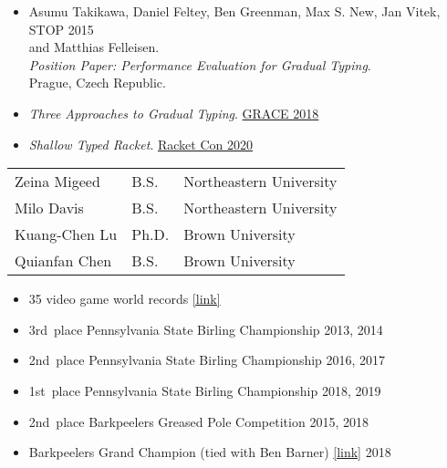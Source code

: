 \documentclass{article}
\begin{document}
\begin{itemize}
\item
  Asumu Takikawa, Daniel Feltey, Ben Greenman, Max S. New, Jan Vitek, \hfill STOP 2015 \\
   and Matthias Felleisen. \\
   \emph{Position Paper: Performance Evaluation for Gradual Typing}. \\
  Prague, Czech Republic.
\end{itemize}

\newpage
{}
\begin{itemize}
  \item \emph{Three Approaches to Gradual Typing}. \hfill \href{https://2018.splashcon.org/track/grace-2018-papers}{GRACE 2018}
  \item \emph{Shallow Typed Racket}. \hfill \href{https://con.racket-lang.org/2020}{Racket Con 2020}
\end{itemize}



\begin{tabular}{l l l}
  Zeina Migeed & B.S. & Northeastern University
  \\[1ex]
  Milo Davis   & B.S. & Northeastern University
  \\[1ex]
  Kuang-Chen Lu   & Ph.D. & Brown University
  \\[1ex]
  Quianfan Chen   & B.S. & Brown University
\end{tabular}



\begin{itemize}
  \item 35 video game world records \href{https://www.twingalaxies.com/scores.php?player=43761}{[link]} \hfill {}
  \item 3rd~place Pennsylvania State Birling Championship \hfill 2013, 2014
  \item 2nd~place Pennsylvania State Birling Championship \hfill 2016, 2017
  \item 1st~place Pennsylvania State Birling Championship \hfill 2018, 2019
  \item 2nd~place Barkpeelers Greased Pole Competition \hfill 2015, 2018
  \item Barkpeelers Grand Champion (tied with Ben Barner) \href{http://lumbermuseum.org/bark-peeler-festival/festival-events-2019/bark-peeler-festival-2018/}{[link]} \hfill 2018
\end{itemize}
\end{document}
